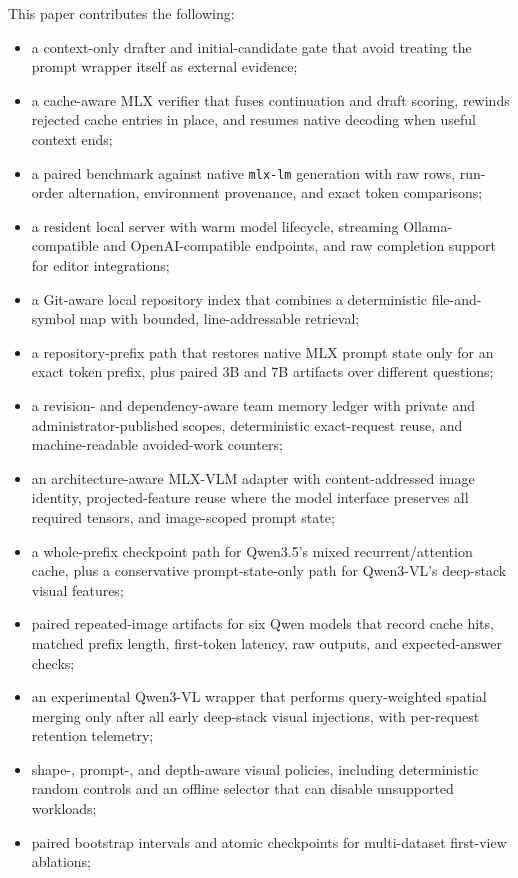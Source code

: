 \documentclass[11pt]{article}
\begin{document}
This paper contributes the following:
\begin{itemize}[leftmargin=*]
  \item a context-only drafter and initial-candidate gate that avoid treating the prompt wrapper itself as external evidence;
  \item a cache-aware MLX verifier that fuses continuation and draft scoring, rewinds rejected cache entries in place, and resumes native decoding when useful context ends;
  \item a paired benchmark against native \texttt{mlx-lm} generation with raw rows, run-order alternation, environment provenance, and exact token comparisons;
  \item a resident local server with warm model lifecycle, streaming Ollama-compatible and OpenAI-compatible endpoints, and raw completion support for editor integrations;
  \item a Git-aware local repository index that combines a deterministic
  file-and-symbol map with bounded, line-addressable retrieval;
  \item a repository-prefix path that restores native MLX prompt state only for
  an exact token prefix, plus paired 3B and 7B artifacts over different
  questions;
  \item a revision- and dependency-aware team memory ledger with private and
  administrator-published scopes, deterministic exact-request reuse, and
  machine-readable avoided-work counters;
  \item an architecture-aware MLX-VLM adapter with content-addressed image identity, projected-feature reuse where the model interface preserves all required tensors, and image-scoped prompt state;
  \item a whole-prefix checkpoint path for Qwen3.5's mixed recurrent/attention cache, plus a conservative prompt-state-only path for Qwen3-VL's deep-stack visual features;
  \item paired repeated-image artifacts for six Qwen models that record cache hits, matched prefix length, first-token latency, raw outputs, and expected-answer checks;
  \item an experimental Qwen3-VL wrapper that performs query-weighted spatial merging only after all early deep-stack visual injections, with per-request retention telemetry;
  \item shape-, prompt-, and depth-aware visual policies, including deterministic random controls and an offline selector that can disable unsupported workloads;
  \item paired bootstrap intervals and atomic checkpoints for multi-dataset first-view ablations;

\end{itemize}
\end{document}
